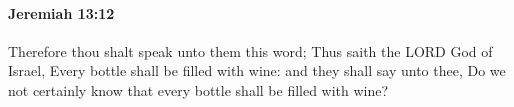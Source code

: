 
		\paragraph{Jeremiah 13:12} %
			\label{JEREMIAH-13-12}

			Therefore thou shalt speak unto them this word; Thus saith the LORD God of Israel, Every bottle shall be filled with wine: and they shall say unto thee, Do we not certainly know that every bottle shall be filled with wine?


